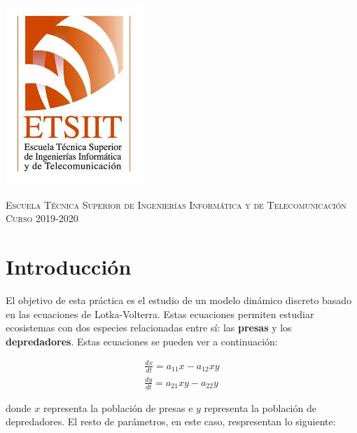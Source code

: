 \documentclass[11pt,a4paper]{article}
\begin{document}
\begin{titlepage}
\begin{minipage}{\textwidth}
\includegraphics[scale=0.3]{img/etsiit.jpeg}

\vspace{0.7cm}
\textsc{Escuela Técnica Superior de Ingenierías Informática y de Telecomunicación}\\
\vspace{1cm}
\textsc{Curso 2019-2020}
\end{minipage}
\end{titlepage}

\tableofcontents
\thispagestyle{empty}				%

\newpage

\setlength{\parskip}{1em}

\section{Introducción}

El objetivo de esta práctica es el estudio de un modelo dinámico discreto basado
en las ecuaciones de Lotka-Volterra. Estas ecuaciones permiten estudiar ecosistemas
con dos especies relacionadas entre sí: las \textbf{presas} y los \textbf{depredadores}.
Estas ecuaciones se pueden ver a continuación:

\begin{equation}
\begin{split}
\frac{dx}{dt} = a_{11}x - a_{12}xy \\
\frac{dy}{dt} = a_{21}xy - a_{22}y
\end{split}
\end{equation}

\noindent donde $x$ representa la población de presas e $y$ representa la población
de depredadores. El resto de parámetros, en este caso, respresentan lo siguiente:
\end{document}

